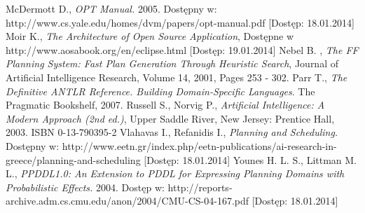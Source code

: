 \begin{thebibliography}{1}
 McDermott D., \emph{OPT Manual.} 2005. Dostępny w: http://www.cs.yale.edu/homes/dvm/papers/opt-manual.pdf [Dostęp: 18.01.2014]
 Moir K., \emph{The Architecture of Open Source Application}, Dostępne w http://www.aosabook.org/en/eclipse.html [Dostęp: 19.01.2014]
 Nebel B. , \emph{The FF Planning System: Fast Plan Generation Through Heuristic Search},  Journal of Artificial Intelligence Research, Volume 14, 2001, Pages 253 - 302.
Parr T., \emph{The Definitive ANTLR Reference. Building Domain-Specific Languages}. 
The Pragmatic Bookshelf, 2007.
 Russell S., Norvig P., \emph{Artificial Intelligence: A
Modern Approach (2nd ed.)}, Upper Saddle River, New Jersey: Prentice Hall, 2003.
ISBN 0-13-790395-2
 Vlahavas I., Refanidis I., \emph{Planning and Scheduling.} Dostępny w: http://www.eetn.gr/index.php/eetn-publications/ai-research-in-greece/planning-and-scheduling [Dostęp: 18.01.2014]
 Younes H. L. S., Littman M. L., \emph{PPDDL1.0: An Extension to PDDL for Expressing
Planning Domains with Probabilistic Effects.} 2004. Dostęp w: http://reports-archive.adm.cs.cmu.edu/anon/2004/CMU-CS-04-167.pdf [Dostęp: 18.01.2014]










\end{thebibliography}
